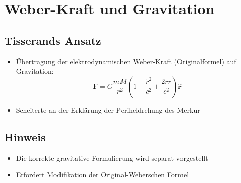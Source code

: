 \section{Weber-Kraft und Gravitation}

\subsection*{Tisserands Ansatz}
\begin{itemize}[leftmargin=*,noitemsep]
    \item Übertragung der elektrodynamischen Weber-Kraft (Originalformel) auf Gravitation:
    \[ \bm{F} = G\frac{mM}{r^2}\left(1 - \frac{\dot{r}^2}{c^2} + \frac{2r\ddot{r}}{c^2}\right)\bm{\hat{r}} \]
    \item Scheiterte an der Erklärung der Periheldrehung des Merkur
\end{itemize}

\subsection*{Hinweis}
\begin{itemize}[leftmargin=*,noitemsep]
    \item Die korrekte gravitative Formulierung wird separat vorgestellt
    \item Erfordert Modifikation der Original-Weberschen Formel
\end{itemize}
